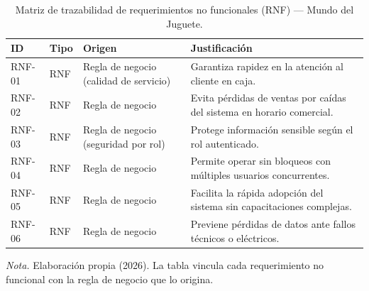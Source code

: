 \begin{table}[H]
  \centering
  \caption{Matriz de trazabilidad de requerimientos no funcionales (RNF) --- Mundo del Juguete.}
  \label{tab:matriz_trazabilidad_rnf}
  \begin{tabularx}{\textwidth}{|L{1.4cm}|C{1.1cm}|L{4.1cm}|X|}
    \hline
    \textbf{ID} & \textbf{Tipo} & \textbf{Origen} & \textbf{Justificación} \\
    \hline
    RNF-01 & RNF & Regla de negocio (calidad de servicio) & Garantiza rapidez en la atención al cliente en caja. \\
    RNF-02 & RNF & Regla de negocio & Evita pérdidas de ventas por caídas del sistema en horario comercial. \\
    RNF-03 & RNF & Regla de negocio (seguridad por rol) & Protege información sensible según el rol autenticado. \\
    RNF-04 & RNF & Regla de negocio & Permite operar sin bloqueos con múltiples usuarios concurrentes. \\
    RNF-05 & RNF & Regla de negocio & Facilita la rápida adopción del sistema sin capacitaciones complejas. \\
    RNF-06 & RNF & Regla de negocio & Previene pérdidas de datos ante fallos técnicos o eléctricos. \\
    \hline
  \end{tabularx}
  \par\vspace{1ex}
  \raggedright\noindent\small\emph{Nota.} Elaboración propia (2026). La tabla vincula cada requerimiento no funcional con la regla de negocio que lo origina.
\end{table}
